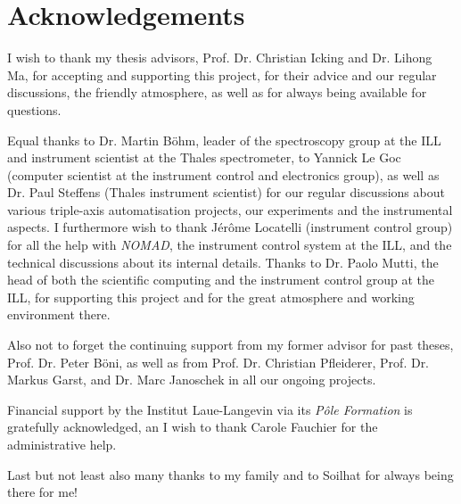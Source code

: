 %
%

\chapter*{Acknowledgements}

I wish to thank my thesis advisors, Prof. Dr. Christian Icking and Dr. Lihong Ma, for accepting 
and supporting this project, for their advice and our regular discussions, the friendly atmosphere, 
as well as for always being available for questions.

Equal thanks to Dr. Martin B\"ohm, leader of the spectroscopy group at the ILL and instrument 
scientist at the Thales spectrometer, to Yannick Le Goc (computer scientist at the instrument 
control and electronics group), as well as Dr. Paul Steffens (Thales instrument scientist) for our 
regular discussions about various triple-axis automatisation projects, our experiments and the
instrumental aspects. I furthermore wish to thank Jérôme Locatelli (instrument control group) for
all the help with \textit{NOMAD}, the instrument control system at the ILL, and the technical discussions
about its internal details. 
Thanks to Dr. Paolo Mutti, the head of both the scientific computing and the instrument control group 
at the ILL, for supporting this project and for the great atmosphere and working environment there.

Also not to forget the continuing support from my former advisor for past theses, Prof. Dr. Peter B\"oni,
as well as from Prof. Dr. Christian Pfleiderer, Prof. Dr. Markus Garst, and Dr. Marc Janoschek in all our ongoing projects.

Financial support by the Institut Laue-Langevin via its \textit{P\^ole Formation} is gratefully acknowledged,
an I wish to thank Carole Fauchier for the administrative help.

Last but not least also many thanks to my family and to Soilhat for always being there for me!
